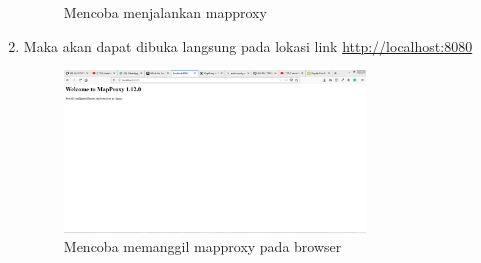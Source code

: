 \begin{enumerate}
\begin{figure}[H]
		\centering
		\caption{Mencoba menjalankan mapproxy}
	\end{figure}
    \item Maka akan dapat dibuka langsung pada lokasi link \href{http://localhost:8080}{http://localhost:8080}
    \hfill\break
	\begin{figure}[H]
		\includegraphics[width=8cm]{figures/1174035/tugas4/yaml_7.png}
		\centering
		\caption{Mencoba memanggil mapproxy pada browser}
	\end{figure}
\end{enumerate}





